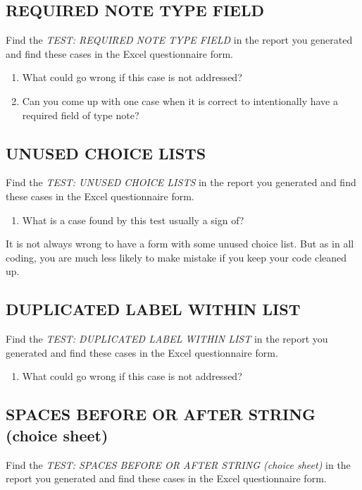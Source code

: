 \documentclass{tufte-handout}
\begin{document}
\subsection{REQUIRED NOTE TYPE FIELD}
	Find the \textit{TEST: REQUIRED NOTE TYPE FIELD} in the report you generated and find these cases in the Excel questionnaire form.
	
	\begin{enumerate}
		\item What could go wrong if this case is not addressed?
		\item Can you come up with one case when it is correct to intentionally have a required field of type note?
	\end{enumerate}

\subsection{UNUSED CHOICE LISTS}
	Find the \textit{TEST: UNUSED CHOICE LISTS} in the report you generated and find these cases in the Excel questionnaire form.
	
	\begin{enumerate}
		\item What is a case found by this test usually a sign of? 
	\end{enumerate}
	
	\noindent It is not always wrong to have a form with some unused choice list. But as in all coding, you are much less likely to make mistake if you keep your code cleaned up.

\subsection{DUPLICATED LABEL WITHIN LIST}
	Find the \textit{TEST: DUPLICATED LABEL WITHIN LIST} in the report you generated and find these cases in the Excel questionnaire form.
	
	\begin{enumerate}
		\item What could go wrong if this case is not addressed?  
	\end{enumerate}

\subsection{SPACES BEFORE OR AFTER STRING (choice sheet)}
	Find the \textit{TEST: SPACES BEFORE OR AFTER STRING (choice sheet)} in the report you generated and find these cases in the Excel questionnaire form.
	
\end{document}
